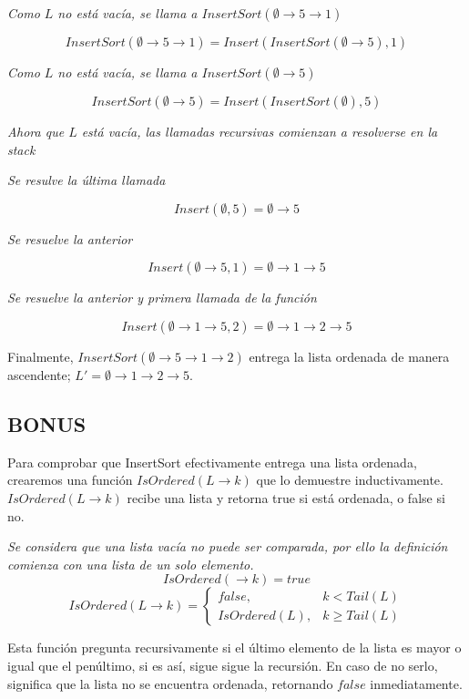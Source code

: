 \documentclass[../doc.tex]{subfiles}
\begin{document}
\emph{Como $L$ no está vacía, se llama a $InsertSort(\emptyset \rightarrow 5 \rightarrow 1)$}

\[InsertSort(\emptyset \rightarrow 5 \rightarrow 1) = Insert(InsertSort(\emptyset \rightarrow 5),1) \]

\emph{Como $L$ no está vacía, se llama a $InsertSort(\emptyset \rightarrow 5)$}

\[InsertSort(\emptyset \rightarrow 5) = Insert(InsertSort(\emptyset),5) \]

\emph{Ahora que $L$ está vacía, las llamadas recursivas comienzan a resolverse en la stack}

\emph{Se resulve la última llamada}

\[Insert(\emptyset,5) = \emptyset \rightarrow 5\]

\emph{Se resuelve la anterior}

\[Insert(\emptyset \rightarrow 5,1) = \emptyset \rightarrow 1 \rightarrow 5\]

\emph{Se resuelve la anterior y primera llamada de la función}

\[Insert(\emptyset \rightarrow 1 \rightarrow 5,2) = \emptyset \rightarrow 1 \rightarrow 2 \rightarrow 5\]

Finalmente, $InsertSort(\emptyset \rightarrow 5 \rightarrow 1 \rightarrow 2)$
entrega la lista ordenada de manera ascendente; $L' = \emptyset \rightarrow 1
\rightarrow 2 \rightarrow 5$. 

\subsection{BONUS}
Para comprobar que InsertSort efectivamente entrega una lista ordenada,
crearemos una función $IsOrdered(L \rightarrow k)$ que lo demuestre
inductivamente. $IsOrdered(L \rightarrow k)$ recibe una lista y retorna true si
está ordenada, o false si no.

\textit{
Se considera que una lista vacía no puede ser comparada, por ello la definición
comienza con una lista de un solo elemento.}
\[IsOrdered(\rightarrow k) = true\]
\[IsOrdered(L \rightarrow k) =
\left\{
\begin{array}{lr}
  false, & k < Tail(L)\\
  IsOrdered(L), & k \ge Tail(L)
\end{array} \right .\]

Esta función pregunta recursivamente si el último elemento de la lista es mayor 
o igual que el penúltimo, si es así, sigue sigue la recursión. En caso de no 
serlo, significa que la lista no se encuentra ordenada, retornando $false$ 
inmediatamente.
\end{document}

